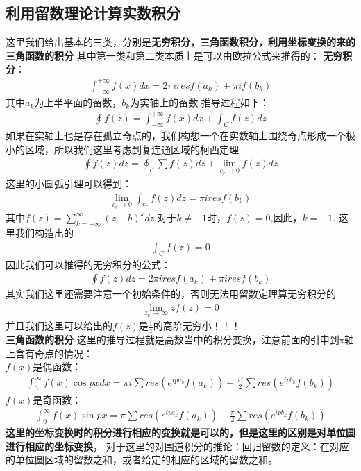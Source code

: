 \documentclass[UTF8]{article}
\begin{document}
\subsection{利用留数理论计算实数积分}
这里我们给出基本的三类，分别是\textbf{无穷积分，三角函数积分，利用坐标变换的来的三角函数的积分}
其中第一类和第二类本质上是可以由欧拉公式来推得的：
\textbf{无穷积分}：
\begin{align*}
	\int_{-\infty}^{+\infty}f(x)dx=2\pi i resf(a_k)+\pi if(b_k)
\end{align*}
其中$a_k$为上半平面的留数，$b_k$为实轴上的留数
推导过程如下：
\begin{gather*}
	\oint f(z)=\int_{-\infty}^{+\infty}f(x)dx+\int_C f(z)dz
\end{gather*}
如果在实轴上也是存在孤立奇点的，我们构想一个在实数轴上围绕奇点形成一个极小的区域，所以我们这里考虑到复连通区域的柯西定理
\begin{align*}
	\oint f(z)dz=\oint_{l'}\sum f(z)dz+\lim_{c_r\rightarrow 0}f(z)dz
\end{align*}
这里的小圆弧引理可以得到：
\begin{align*}
	\lim_{c_r\rightarrow 0}\int_{c_r}f(z)dz=\pi i resf(b_k)
\end{align*}
其中$f(z)=\sum_{k=-\infty}^{\infty}(z-b)^k dz$,对于$k\neq -1$时，$f(z)=0$,因此，$k=-1$.
这里我们构造出的
\begin{align*}
	\int_Cf(z)=0
\end{align*}
因此我们可以推得的无穷积分的公式：
\begin{align*}
	\oint f(z)dz=2\pi i resf(a_k)+\pi i resf(b_k)
\end{align*}
其实我们这里还需要注意一个初始条件的，否则无法用留数定理算无穷积分的
\begin{align*}
	\lim_{z_k\rightarrow \infty}zf(z)=0
\end{align*}
并且我们这里可以给出的$f(z)$是$\frac{1}{z}$的高阶无穷小！！！\\
\textbf{三角函数的积分}
这里的推导过程就是高数当中的积分变换，注意前面的引申到x轴上含有奇点的情况：\\
$f(x)$是偶函数：
\begin{align*}
	\int_{0}^{\infty}f(x)\cos px dx=\pi i \sum res(e^{ipa_k}f(a_k))+\frac{\pi i}{2}\sum res(e^{ipb_k}f(b_k))
\end{align*}
$f(x)$是奇函数：
\begin{align*}
	\int_{0}^{\infty}f(x)\sin px=\pi \sum res(e^{ipa_k}f(a_k))+\frac{\pi}{2}\sum res(e^{ipb_k}f(b_k))
\end{align*}
\textbf{这里的坐标变换时的积分进行相应的变换就是可以的，但是这里的区别是对单位圆进行相应的坐标变换}，
对于这里的对围道积分的推论：回归留数的定义：在对应的单位圆区域的留数之和，或者给定的相应的区域的留数之和。
\end{document}

